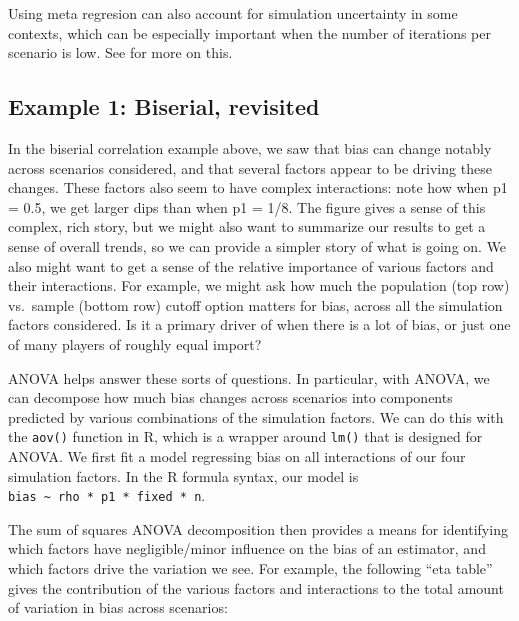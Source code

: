 \documentclass[
]{book}
\begin{document}
Using meta regresion can also account for simulation uncertainty in some contexts, which can be especially important when the number of iterations per scenario is low.
See \citet{gilbert2024multilevel} for more on this.

\subsection{Example 1: Biserial, revisited}\label{example-1-biserial-revisited}

In the biserial correlation example above, we saw that bias can change notably across scenarios considered, and that several factors appear to be driving these changes.
These factors also seem to have complex interactions: note how when p1 = 0.5, we get larger dips than when p1 = 1/8.
The figure gives a sense of this complex, rich story, but we might also want to summarize our results to get a sense of overall trends, so we can provide a simpler story of what is going on.
We also might want to get a sense of the relative importance of various factors and their interactions.
For example, we might ask how much the population (top row) vs.~sample (bottom row) cutoff option matters for bias, across all the simulation factors considered.
Is it a primary driver of when there is a lot of bias, or just one of many players of roughly equal import?

ANOVA helps answer these sorts of questions.
In particular, with ANOVA, we can decompose how much bias changes across scenarios into components predicted by various combinations of the simulation factors.
We can do this with the \texttt{aov()} function in R, which is a wrapper around \texttt{lm()} that is designed for ANOVA.
We first fit a model regressing bias on all interactions of our four simulation factors.
In the R formula syntax, our model is \texttt{bias\ \textasciitilde{}\ rho\ *\ p1\ *\ fixed\ *\ n}.

The sum of squares ANOVA decomposition then provides a means for identifying which factors have negligible/minor influence on the bias of an estimator, and which factors drive the variation we see.
For example, the following ``eta table'' gives the contribution of the various factors and interactions to the total amount of variation in bias across scenarios:
\end{document}
